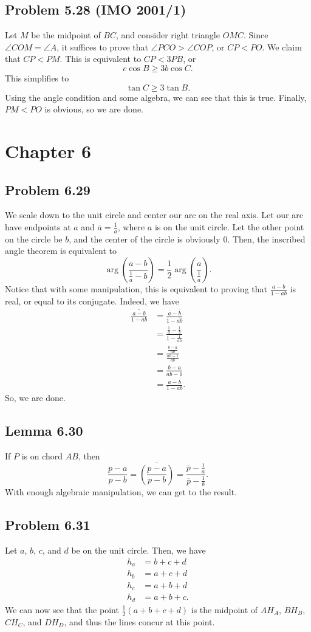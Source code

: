 \documentclass{scrartcl}
\begin{document}
\subsection*{Problem 5.28 (IMO 2001/1)}
Let $M$ be the midpoint of $BC$, and consider right triangle $OMC$.
Since $\angle COM = \angle A$, it suffices to prove that $\angle PCO > \angle COP$, or $CP<PO$.
We claim that $CP < PM$. This is equivalent to $CP < 3PB$, or
\[ c \cos B \geq 3b\cos C. \]
This simplifies to
\[ \tan C \geq 3 \tan B. \]
Using the angle condition and some algebra, we can see that this is true.
Finally, $PM < PO$ is obvious, so we are done.
\section*{Chapter 6}
\subsection*{Problem 6.29}
We scale down to the unit circle and center our arc on the real axis. Let our arc have endpoints at $a$ and $\overline{a} = \frac{1}{a}$, where $a$ is on the unit circle. Let the other point on the circle be $b$, and the center of the circle is obviously $0$.
Then, the inscribed angle theorem is equivalent to
\[
    \arg \left(\frac{a-b}{\frac{1}{a}-b}\right) = \frac{1}{2} \arg \left(\frac{a}{\frac{1}{a}}\right).
\]
Notice that with some manipulation, this is equivalent to proving that $\frac{a-b}{1-ab}$ is real, or equal to its conjugate. Indeed, we have
\begin{align*}
    \overline{\frac{a-b}{1-ab}} &= \frac{\overline{a} - \overline{b}}{1 - \overline{ab}} \\
    &= \frac{\frac{1}{a} - \frac{1}{b}}{1 - \frac{1}{ab}} \\
    &= \frac{\frac{b - a}{ab}}{\frac{ab - 1}{ab}} \\
    &= \frac{b-a}{ab-1} \\
    &= \frac{a-b}{1-ab}.
\end{align*}
So, we are done.
\subsection*{Lemma 6.30}
If $P$ is on chord $AB$, then
\[
    \frac{p-a}{p-b} = \overline{\left(\frac{p-a}{p-b}\right)} = \frac{\overline{p} - \frac{1}{a}}{\overline{p} - \frac{1}{b}}.
\]
With enough algebraic manipulation, we can get to the result.
\subsection*{Problem 6.31}
Let $a$, $b$, $c$, and $d$ be on the unit circle. Then, we have
\begin{align*}
    h_a &= b + c + d \\
    h_b &= a + c + d \\
    h_c &= a + b + d \\
    h_d &= a + b + c.
\end{align*}
We can now see that the point $\frac{1}{2} (a + b + c + d)$ is the midpoint of $AH_A$, $BH_B$, $CH_C$, and $DH_D$, and thus the lines concur at this point.
\end{document}
